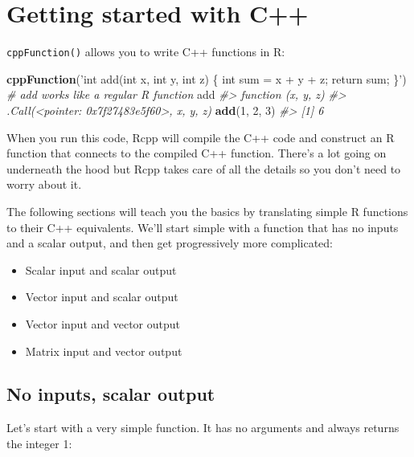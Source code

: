 \documentclass[]{book}
\makeatletter
\newenvironment{Shaded}{\begin{snugshade}}{\end{snugshade}}
\newcommand{\CommentTok}[1]{\textcolor[rgb]{0.37,0.37,0.37}{\textit{#1}}}
\newcommand{\DecValTok}[1]{\textcolor[rgb]{0.06,0.06,0.06}{#1}}
\newcommand{\KeywordTok}[1]{\textcolor[rgb]{0.27,0.27,0.27}{\textbf{#1}}}
\newcommand{\NormalTok}[1]{#1}
\newcommand{\StringTok}[1]{\textcolor[rgb]{0.5,0.5,0.5}{#1}}
\providecommand{\tightlist}{%
  \setlength{\itemsep}{0pt}\setlength{\parskip}{0pt}}
\newcommand{\indexc}[1]{\index{#1@\texttt{#1}}}
\makeatother
\begin{document}
\hypertarget{rcpp-intro}{%
\section{Getting started with C++}\label{rcpp-intro}}

\texttt{cppFunction()} allows you to write C++ functions in R: \indexc{cppFunction()}

\begin{Shaded}
\begin{Highlighting}[]
\KeywordTok{cppFunction}\NormalTok{(}\StringTok{'int add(int x, int y, int z) \{}
\StringTok{  int sum = x + y + z;}
\StringTok{  return sum;}
\StringTok{\}'}\NormalTok{)}
\CommentTok{# add works like a regular R function}
\NormalTok{add}
\CommentTok{#> function (x, y, z) }
\CommentTok{#> .Call(<pointer: 0x7f27483e5f60>, x, y, z)}
\KeywordTok{add}\NormalTok{(}\DecValTok{1}\NormalTok{, }\DecValTok{2}\NormalTok{, }\DecValTok{3}\NormalTok{)}
\CommentTok{#> [1] 6}
\end{Highlighting}
\end{Shaded}

When you run this code, Rcpp will compile the C++ code and construct an R function that connects to the compiled C++ function. There's a lot going on underneath the hood but Rcpp takes care of all the details so you don't need to worry about it.

The following sections will teach you the basics by translating simple R functions to their C++ equivalents. We'll start simple with a function that has no inputs and a scalar output, and then get progressively more complicated:

\begin{itemize}
\tightlist
\item
  Scalar input and scalar output
\item
  Vector input and scalar output
\item
  Vector input and vector output
\item
  Matrix input and vector output
\end{itemize}

\hypertarget{no-inputs-scalar-output}{%
\subsection{No inputs, scalar output}\label{no-inputs-scalar-output}}

Let's start with a very simple function. It has no arguments and always returns the integer 1:
\end{document}
